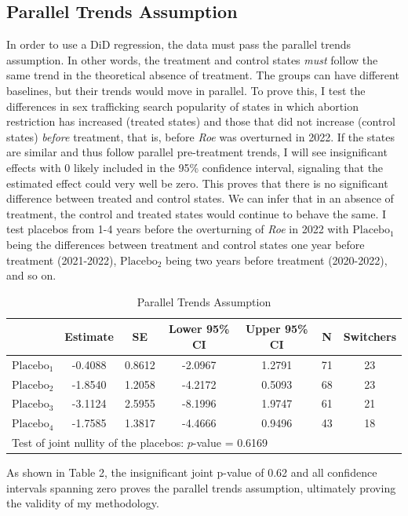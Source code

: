 \documentclass[10pt]{article}
\begin{document}
\subsection{Parallel Trends Assumption}
In order to use a DiD regression, the data must pass the parallel trends assumption. In other words, the treatment and control states \textit{must} follow the same trend in the theoretical absence of treatment. The groups can have different baselines, but their trends would move in parallel. To prove this, I test the differences in sex trafficking search popularity of states in which abortion restriction has increased (treated states) and those that did not increase (control states) \textit{before} treatment, that is, before \textit{Roe} was overturned in 2022. If the states are similar and thus follow parallel pre-treatment trends, I will see insignificant effects with 0 likely included in the 95\% confidence interval, signaling that the estimated effect could very well be zero. This proves that there is no significant difference between treated and control states. We can infer that in an absence of treatment, the control and treated states would continue to behave the same. I test placebos from 1-4 years before the overturning of \textit{Roe} in 2022 with $\text{Placebo}_1$ being the differences between treatment and control states one year before treatment (2021-2022), $\text{Placebo}_2$ being two years before treatment (2020-2022), and so on.
\begin{table}[H]
\centering
\begin{tabular}{lcccccc}

 & Estimate & SE & Lower 95\% CI & Upper 95\% CI & N & Switchers \\
\midrule
$\text{Placebo}_1$ & -0.4088 & 0.8612 & -2.0967 & 1.2791 & 71 & 23 \\
$\text{Placebo}_2$ & -1.8540 & 1.2058 & -4.2172 & 0.5093 & 68 & 23 \\
$\text{Placebo}_3$ & -3.1124 & 2.5955 & -8.1996 & 1.9747 & 61 & 21 \\
$\text{Placebo}_4$ & -1.7585 & 1.3817 & -4.4666 & 0.9496 & 43 & 18 \\
\midrule
\multicolumn{7}{l}{\footnotesize Test of joint nullity of the placebos: $p$-value = 0.6169} \\
\bottomrule
\end{tabular}
\caption{Parallel Trends Assumption}
\end{table}
As shown in Table 2, the insignificant joint p-value of 0.62 and all confidence intervals spanning zero proves the parallel trends assumption, ultimately proving the validity of my methodology. 
\newpage
\end{document}
